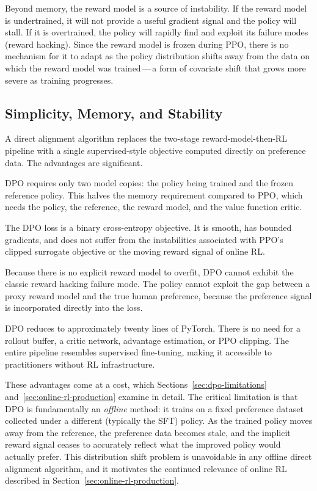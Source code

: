 Beyond memory, the reward model is a source of instability. If the reward model is undertrained, it will not provide a useful gradient signal and the policy will stall. If it is overtrained, the policy will rapidly find and exploit its failure modes (reward hacking). Since the reward model is frozen during PPO, there is no mechanism for it to adapt as the policy distribution shifts away from the data on which the reward model was trained\,---\,a form of covariate shift that grows more severe as training progresses.

\subsection{Simplicity, Memory, and Stability}

A direct alignment algorithm replaces the two-stage reward-model-then-RL pipeline with a single supervised-style objective computed directly on preference data. The advantages are significant.

\begin{description}[leftmargin=!,labelwidth=3.5cm]
  \item[Memory footprint] DPO requires only two model copies: the policy being trained and the frozen reference policy. This halves the memory requirement compared to PPO, which needs the policy, the reference, the reward model, and the value function critic.
  \item[Training stability] The DPO loss is a binary cross-entropy objective. It is smooth, has bounded gradients, and does not suffer from the instabilities associated with PPO's clipped surrogate objective or the moving reward signal of online RL.
  \item[No reward hacking] Because there is no explicit reward model to overfit, DPO cannot exhibit the classic reward hacking failure mode. The policy cannot exploit the gap between a proxy reward model and the true human preference, because the preference signal is incorporated directly into the loss.
  \item[Simplicity of implementation] DPO reduces to approximately twenty lines of PyTorch. There is no need for a rollout buffer, a critic network, advantage estimation, or PPO clipping. The entire pipeline resembles supervised fine-tuning, making it accessible to practitioners without RL infrastructure.
\end{description}

These advantages come at a cost, which Sections~\ref{sec:dpo-limitations} and~\ref{sec:online-rl-production} examine in detail. The critical limitation is that DPO is fundamentally an \emph{offline} method: it trains on a fixed preference dataset collected under a different (typically the SFT) policy. As the trained policy moves away from the reference, the preference data becomes stale, and the implicit reward signal ceases to accurately reflect what the improved policy would actually prefer. This distribution shift problem is unavoidable in any offline direct alignment algorithm, and it motivates the continued relevance of online RL described in Section~\ref{sec:online-rl-production}.

